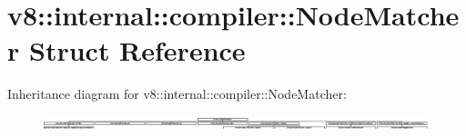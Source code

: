 \hypertarget{structv8_1_1internal_1_1compiler_1_1_node_matcher}{}\section{v8\+:\+:internal\+:\+:compiler\+:\+:Node\+Matcher Struct Reference}
\label{structv8_1_1internal_1_1compiler_1_1_node_matcher}
Inheritance diagram for v8\+:\+:internal\+:\+:compiler\+:\+:Node\+Matcher\+:\begin{figure}[H]
\begin{center}
\leavevmode
\includegraphics[height=0.372340cm]{structv8_1_1internal_1_1compiler_1_1_node_matcher}
\end{center}
\end{figure}
